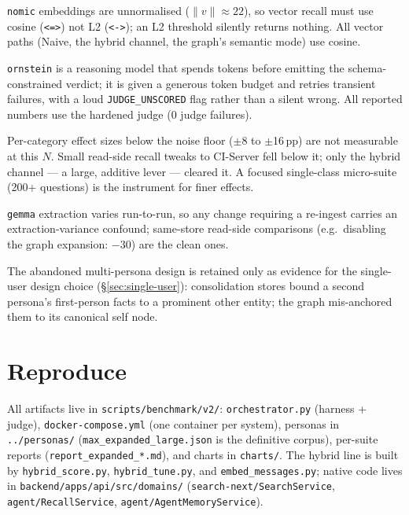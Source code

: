 \documentclass[11pt]{article}
\begin{document}
\begin{description}[style=nextline,leftmargin=1em,nosep]
  \item[Distance metric.] \texttt{nomic} embeddings are unnormalised ($\|v\|\approx 22$), so vector recall must
  use cosine (\texttt{<=>}) not L2 (\texttt{<->}); an L2 threshold silently returns nothing. All vector paths
  (Naive, the hybrid channel, the graph's semantic mode) use cosine.
  \item[Judge robustness.] \texttt{ornstein} is a reasoning model that spends tokens before emitting the
  schema-constrained verdict; it is given a generous token budget and retries transient failures, with a loud
  \texttt{JUDGE\_UNSCORED} flag rather than a silent wrong. All reported numbers use the hardened judge (0 judge
  failures).
  \item[Resolution limit.] Per-category effect sizes below the noise floor ($\pm$8 to $\pm$16\,pp) are not
  measurable at this $N$. Small read-side recall tweaks to CI-Server fell below it; only the hybrid channel ---
  a large, additive lever --- cleared it. A focused single-class micro-suite (200+ questions) is the instrument
  for finer effects.
  \item[Extraction non-determinism.] \texttt{gemma} extraction varies run-to-run, so any change requiring a
  re-ingest carries an extraction-variance confound; same-store read-side comparisons (e.g.\ disabling the
  graph expansion: $-30$) are the clean ones.
  \item[Single-user validation.] The abandoned multi-persona design is retained only as evidence for the
  single-user design choice (\S\ref{sec:single-user}): consolidation stores bound a second persona's
  first-person facts to a prominent other entity; the graph mis-anchored them to its canonical self node.
\end{description}

\section*{Reproduce}
\small All artifacts live in \texttt{scripts/benchmark/v2/}: \texttt{orchestrator.py} (harness + judge),
\texttt{docker-compose.yml} (one container per system), personas in \texttt{../personas/}
(\texttt{max\_expanded\_large.json} is the definitive corpus), per-suite reports
(\texttt{report\_expanded\_*.md}), and charts in \texttt{charts/}. The hybrid line is built by
\texttt{hybrid\_score.py}, \texttt{hybrid\_tune.py}, and \texttt{embed\_messages.py}; native code lives in
\texttt{backend/apps/api/src/domains/} (\texttt{search-next/SearchService}, \texttt{agent/RecallService},
\texttt{agent/AgentMemoryService}).
\end{document}
